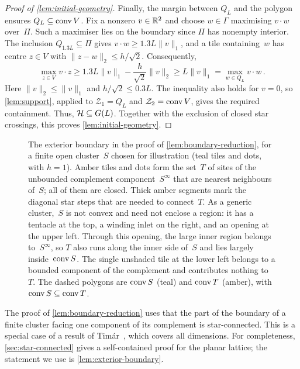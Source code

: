 \documentclass[11pt,letterpaper]{article}
\begin{document}
\begin{proof}[Proof of \cref{lem:initial-geometry}]
Finally, the margin between $Q_L$ and the polygon ensures $Q_L\subseteq\operatorname{conv} V$. Fix a nonzero $v\in\mathbb R^2$ and choose $w\in\Gamma$ maximising $v\cdot w$ over~$\Pi$. Such a maximiser lies on the boundary since $\Pi$ has nonempty interior. The inclusion $Q_{1.3L}\subseteq \Pi$ gives $v\cdot w\ge1.3L\lVert v\rVert_1$, and a tile containing~$w$ has centre $z\in V$ with $\lVert z-w\rVert_2\le h/\sqrt2$. Consequently,
\begin{equation}\label{eq:initial-convex-hull}
  \max_{z\in V}v\cdot z\ge1.3L\lVert v\rVert_1-\frac{h}{\sqrt2}\lVert v\rVert_2\ge L\lVert v\rVert_1=\max_{w\in Q_L}v\cdot w\,.
\end{equation}
Here $\lVert v\rVert_2\le\lVert v\rVert_1$ and $h/\sqrt2\le0.3L$. The inequality also holds for $v=0$, so \cref{lem:support}, applied to $\mathcal Z_1=Q_L$ and $\mathcal Z_2=\operatorname{conv} V$, gives the required containment. Thus, $\mathcal H\subseteq G(L)$. Together with the exclusion of closed star crossings, this proves \cref{lem:initial-geometry}.
\end{proof}

\begin{figure}[t]
  \centering
  
  \caption{The exterior boundary in the proof of \cref{lem:boundary-reduction}, for a finite open cluster~$S$ chosen for illustration (teal tiles and dots, with $h=1$). Amber tiles and dots form the set~$T$ of sites of the unbounded complement component~$S^\infty$ that are nearest neighbours of~$S$; all of them are closed. Thick amber segments mark the diagonal star steps that are needed to connect~$T$. As a generic cluster,~$S$ is not convex and need not enclose a region: it has a tentacle at the top, a winding inlet on the right, and an opening at the upper left. Through this opening, the large inner region belongs to~$S^\infty$, so $T$ also runs along the inner side of~$S$ and lies largely inside~$\operatorname{conv} S$. The single unshaded tile at the lower left belongs to a bounded component of the complement and contributes nothing to~$T$. The dashed polygons are $\operatorname{conv} S$ (teal) and $\operatorname{conv} T$ (amber), with $\operatorname{conv} S\subseteq\operatorname{conv} T$.}
  \label{fig:boundary}
\end{figure}

The proof of \cref{lem:boundary-reduction} uses that the part of the boundary of a finite cluster facing one component of its complement is star-connected. This is a special case of a result of Tim\'ar~\cite[Lemma~2]{Tim13}, which covers all dimensions.
For completeness, \cref{sec:star-connected} gives a self-contained proof for the planar lattice; the statement we use is \cref{lem:exterior-boundary}.
\end{document}
